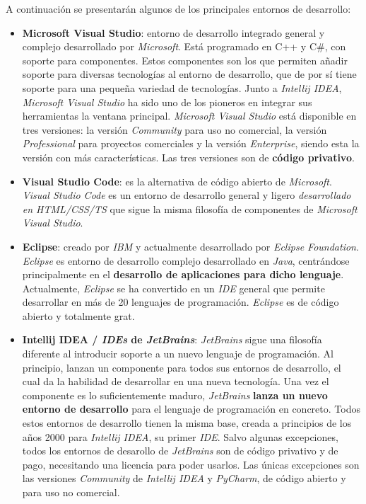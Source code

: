 A continuación se presentarán algunos de los principales
entornos de desarrollo:
\begin{itemize}
    \item \textbf{Microsoft Visual Studio}\cite{VISUALSTUDIO}: entorno de desarrollo
    integrado general y complejo desarrollado por \textit{Microsoft}.
    Está programado en C++ y C\#, con soporte para componentes.
    Estos componentes son los que permiten añadir soporte para diversas tecnologías
    al entorno de desarrollo,  que  de por sí tiene soporte para una pequeña
    variedad de tecnologías.
    Junto a \textit{Intellij IDEA}, \textit{Microsoft Visual Studio} ha sido uno
    de los pioneros en integrar sus herramientas  la ventana principal.
    \textit{Microsoft Visual Studio} está disponible en tres versiones: la versión
    \textit{Community} para uso no comercial, la versión \textit{Professional} para
    proyectos comerciales y la versión \textit{Enterprise}, siendo esta la versión
    con más características.
    Las tres versiones son de \textbf{código privativo}.
    \item \textbf{Visual Studio Code}\cite{VISUALSTUDIOCODE}:
    es la alternativa de código abierto de \textit{Microsoft}.
    \textit{Visual Studio Code} es un entorno de desarrollo general
    y ligero \textit{desarrollado en HTML/CSS/TS} que sigue la misma filosofía
    de componentes de \textit{Microsoft Visual Studio}.
    \item \textbf{Eclipse}\cite{ECLIPSE}: creado por \textit{IBM} y actualmente
    desarrollado por \textit{Eclipse Foundation}.
    \textit{Eclipse} es entorno de desarrollo complejo desarrollado en \textit{Java},
    centrándose principalmente en el \textbf{desarrollo de aplicaciones para dicho lenguaje}.
    Actualmente, \textit{Eclipse} se ha convertido en un \textit{IDE} general que
    permite desarrollar en más de 20 lenguajes de programación.
    \textit{Eclipse} es de código abierto y totalmente grat.
    \item \textbf{Intellij IDEA / \textit{IDEs} de \textit{JetBrains}}\cite{INTELLIJIDEA}:
    \textit{JetBrains} sigue una filosofía diferente al introducir
    soporte a un nuevo lenguaje de programación.
    Al principio, lanzan un componente para todos sus entornos de desarrollo,
    el cual da la habilidad de desarrollar en una nueva tecnología.
    Una vez el componente es lo suficientemente maduro, \textit{JetBrains}
    \textbf{lanza un nuevo entorno de desarrollo} para el lenguaje de programación
    en concreto.
    Todos estos entornos de desarrollo tienen la misma base, creada a
    principios de los años 2000 para \textit{Intellij IDEA}, su primer \textit{IDE}.
    Salvo algunas excepciones, todos los entornos de desarollo de \textit{JetBrains}
    son de código privativo y de pago, necesitando una licencia para poder usarlos.
    Las únicas excepciones son las versiones \textit{Community} de \textit{Intellij IDEA}
    y \textit{PyCharm}, de código abierto y para uso no comercial.
\end{itemize}
